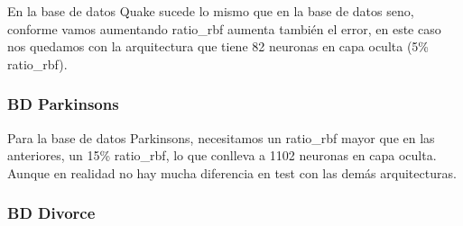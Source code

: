 En la base de datos Quake sucede lo mismo que en la base de datos seno, conforme vamos aumentando ratio\_rbf aumenta también el error, en este caso nos quedamos con la arquitectura que tiene 82 neuronas en capa oculta  (5\% ratio\_rbf).

\subsubsection{BD Parkinsons}
\begin{table}[H]
\centering
\vspace{1ex}
\small
{}
\caption{Base de datos Parkinsons}
\label{table:tabla parkinsons}
\end{table}

Para la base de datos Parkinsons, necesitamos un ratio\_rbf mayor que en las anteriores, un 15\% ratio\_rbf, lo que conlleva a 1102 neuronas en capa oculta. Aunque en realidad no hay mucha diferencia en test con las demás arquitecturas.

\subsubsection{BD Divorce}
\begin{table}[H]
\centering
\vspace{1ex}
\small
{}
\caption{Base de datos Divorce}
\label{table:tabla divorce}
\end{table}

